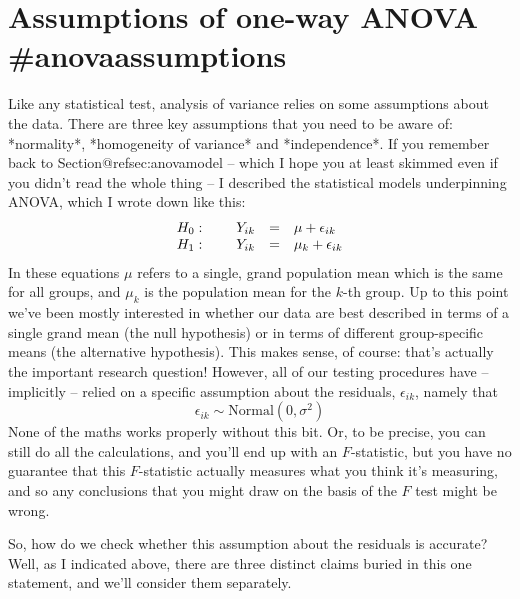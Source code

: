\section{Assumptions of one-way ANOVA {#anovaassumptions}}

Like any statistical test, analysis of variance relies on some assumptions about the data. There are three key assumptions that you need to be aware of: *normality*, *homogeneity of variance* and *independence*. If you remember back to Section@refsec:anovamodel -- which I hope you at least skimmed even if you didn't read the whole thing -- I described the statistical models underpinning ANOVA, which I wrote down like this:
$$
\begin{array}{lrcl}
H_0: \hspace*{.5cm} & Y_{ik} &=& \mu + \epsilon_{ik} \\
H_1: & Y_{ik} &=& \mu_k + \epsilon_{ik} 
\end{array}
$$
In these equations $\mu$ refers to a single, grand population mean which is the same for all groups, and $\mu_k$ is the population mean for the $k$-th group. Up to this point we've been mostly interested in whether our data are best described in terms of a single grand mean (the null hypothesis) or in terms of different group-specific means (the alternative hypothesis). This makes sense, of course: that's actually the important research question! However, all of our testing procedures have -- implicitly -- relied on a specific assumption about the residuals, $\epsilon_{ik}$, namely that
$$
\epsilon_{ik} \sim \mbox{Normal}(0, \sigma^2)
$$
None of the maths works properly without this bit. Or, to be precise, you can still do all the calculations, and you'll end up with an $F$-statistic, but you have no guarantee that this $F$-statistic actually measures what you think it's measuring, and so any conclusions that you might draw on the basis of the $F$ test might be wrong. 

So, how do we check whether this assumption about the residuals is accurate? Well, as I indicated above, there are three distinct claims buried in this one statement, and we'll consider them separately.

